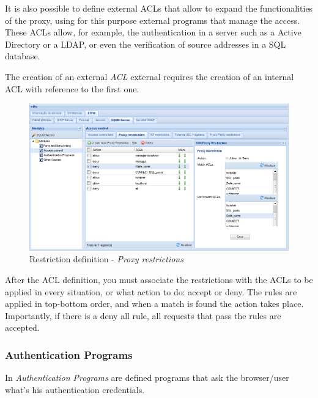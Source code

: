 It is also possible to define external ACLs that allow to expand the functionalities of the proxy, using for this purpose external programs that manage the access.
These ACLs allow, for example, the authentication in a server such as a Active Directory or a LDAP, or even the verification of source addresses in a SQL database.

The creation of an external \textit{ACL} external requires the creation of an internal ACL with reference to the first one.

\begin{figure}[H]
    \begin{center}
    \includegraphics[scale=0.38]{screenshots/etfw/etfw_squid_accesscontrol_04.png}
    \caption{Restriction definition - \textit{Proxy restrictions}}
    \label{fig:etfw_squid_accesscontrol_04}
    \end{center}
\end{figure}

After the ACL definition, you must associate the restrictions with the ACLs to be applied in every situation, or what action to do: accept or deny.
The rules are applied in top-bottom order, and when a match is found the action takes place.
Importantly, if there is a deny all rule, all requests that pass the rules are accepted.

\subsubsection{Authentication Programs}

In \textit{Authentication Programs} are defined programs that ask the browser/user what's his authentication credentials.

